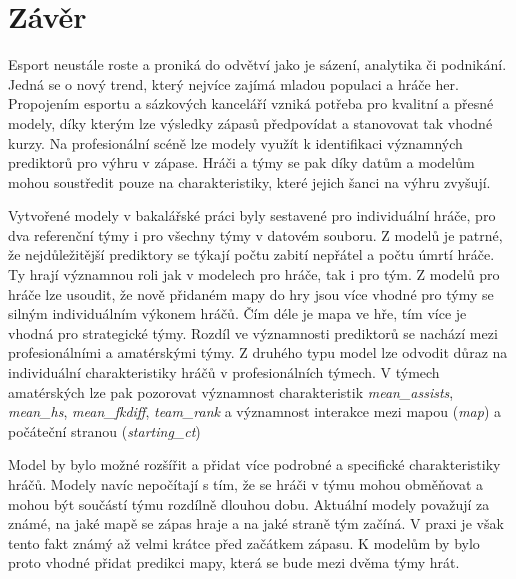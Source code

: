 \chapter{Závěr}
Esport neustále roste a proniká do odvětví jako je sázení, analytika či podnikání. Jedná se o nový trend, který nejvíce zajímá mladou populaci a hráče her.
Propojením esportu a sázkových kanceláří vzniká potřeba pro kvalitní a přesné modely, díky kterým lze výsledky zápasů předpovídat a stanovovat tak
vhodné kurzy. Na profesionální scéně lze modely využít k identifikaci významných prediktorů pro výhru v zápase. Hráči a týmy se pak díky datům a modelům mohou soustředit
pouze na charakteristiky, které jejich šanci na výhru zvyšují.

Vytvořené modely v bakalářské práci byly sestavené pro individuální hráče, pro dva referenční týmy i pro všechny týmy v datovém souboru. Z modelů
je patrné, že nejdůležitější prediktory se týkají počtu zabití nepřátel a počtu úmrtí hráče. Ty hrají významnou roli jak v modelech pro hráče, tak i pro tým. 
Z modelů pro hráče lze usoudit, že nově přidaném mapy do hry jsou více vhodné pro týmy se silným individuálním výkonem hráčů. Čím déle je mapa ve hře, tím více
je vhodná pro strategické týmy. Rozdíl ve významnosti prediktorů se nachází mezi profesionálními a amatérskými týmy. Z druhého typu model lze odvodit důraz na individuální
charakteristiky hráčů v profesionálních týmech. V týmech amatérských lze pak pozorovat významnost charakteristik \textit{mean\_assists}, \textit{mean\_hs}, \textit{mean\_fkdiff},
\textit{team\_rank} a významnost interakce mezi mapou (\textit{map}) a počáteční stranou (\textit{starting\_ct})

Model by bylo možné rozšířit a přidat více podrobné a specifické charakteristiky hráčů. Modely navíc nepočítají s tím, že se hráči v týmu mohou obměňovat a mohou být
součástí týmu rozdílně dlouhou dobu. Aktuální modely považují za známé, na jaké mapě se zápas hraje a na jaké straně tým začíná. V praxi je však tento fakt známý
až velmi krátce před začátkem zápasu. K modelům by bylo proto vhodné přidat predikci mapy, která se bude mezi dvěma týmy hrát.

